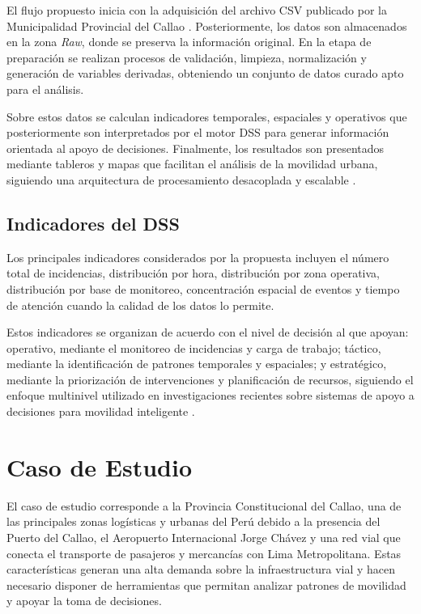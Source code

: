\documentclass[]{IEEEphot}
\begin{document}
El flujo propuesto inicia con la adquisición del archivo CSV publicado por la Municipalidad Provincial del Callao \cite{CallaoIncidencias2026}. Posteriormente, los datos son almacenados en la zona \textit{Raw}, donde se preserva la información original. En la etapa de preparación se realizan procesos de validación, limpieza, normalización y generación de variables derivadas, obteniendo un conjunto de datos curado apto para el análisis.

Sobre estos datos se calculan indicadores temporales, espaciales y operativos que posteriormente son interpretados por el motor DSS para generar información orientada al apoyo de decisiones. Finalmente, los resultados son presentados mediante tableros y mapas que facilitan el análisis de la movilidad urbana, siguiendo una arquitectura de procesamiento desacoplada y escalable \cite{aws2023analyticslens,awsModernDataArchitecture}.

\subsection{Indicadores del DSS}

Los principales indicadores considerados por la propuesta incluyen el número total de incidencias, distribución por hora, distribución por zona operativa, distribución por base de monitoreo, concentración espacial de eventos y tiempo de atención cuando la calidad de los datos lo permite.

Estos indicadores se organizan de acuerdo con el nivel de decisión al que apoyan: operativo, mediante el monitoreo de incidencias y carga de trabajo; táctico, mediante la identificación de patrones temporales y espaciales; y estratégico, mediante la priorización de intervenciones y planificación de recursos, siguiendo el enfoque multinivel utilizado en investigaciones recientes sobre sistemas de apoyo a decisiones para movilidad inteligente \cite{salanova2022multilevel,shulajkovska2024artificial}.



\section{Caso de Estudio}



El caso de estudio corresponde a la Provincia Constitucional del Callao, una de las principales zonas logísticas y urbanas del Perú debido a la presencia del Puerto del Callao, el Aeropuerto Internacional Jorge Chávez y una red vial que conecta el transporte de pasajeros y mercancías con Lima Metropolitana. Estas características generan una alta demanda sobre la infraestructura vial y hacen necesario disponer de herramientas que permitan analizar patrones de movilidad y apoyar la toma de decisiones.
\end{document}
